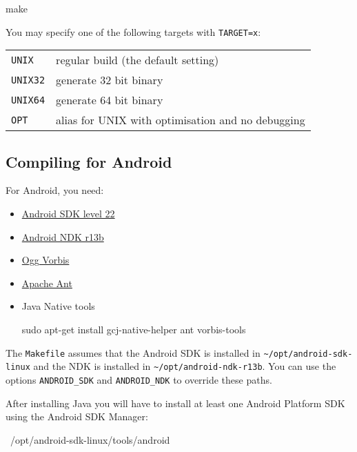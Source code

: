 \begin{verbatim*}
make
\end{verbatim*}

You may specify one of the following targets with \texttt{TARGET=x}:

\begin{tabularx}{1.9\textwidth}{lX}

\texttt{UNIX} & regular build (the default setting) \\

\texttt{UNIX32} & generate 32 bit binary \\

\texttt{UNIX64} & generate 64 bit binary \\

\texttt{OPT} & alias for UNIX with optimisation and no debugging \\

\end{tabularx}

\subsection{Compiling for Android}

For Android, you need:

\begin{itemize}
\item \href{http://developer.android.com/sdk/}{Android SDK level 22}
\item \href{http://developer.android.com/sdk/ndk/}{Android NDK r13b}
\item \href{http://www.vorbis.com/}{Ogg Vorbis}
\item \href{http://ant.apache.org/}{Apache Ant}
\item {Java Native tools 
\begin{verbatim*}
sudo apt-get install gcj-native-helper ant vorbis-tools
\end{verbatim*}}
\end{itemize}

The \texttt{Makefile} assumes that the Android SDK is installed in
\verb|~/opt/android-sdk-linux| and the NDK is installed in
\verb|~/opt/android-ndk-r13b|.  You can use the options
\verb|ANDROID_SDK| and \verb|ANDROID_NDK| to override these paths.

After installing Java you will have to install at least one Android Platform SDK using the Android SDK Manager:

\begin{verbatim*}
~/opt/android-sdk-linux/tools/android
\end{verbatim*}

